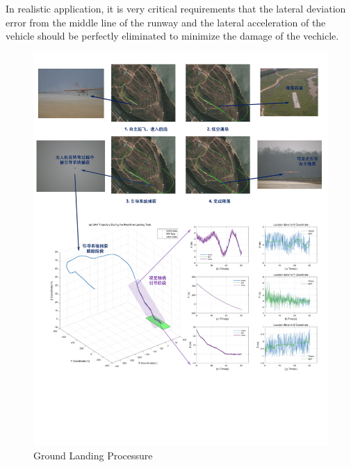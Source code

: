 In realistic application, it is very critical requirements that the lateral deviation error from the middle line of the runway and the lateral acceleration of the vehicle should be perfectly eliminated to minimize the damage of the vechicle.
\begin{figure}[!th]
	\centering
	\includegraphics[width=\textwidth]{Figs/chp08_23_ground_landing.pdf}	
	\caption{Ground Landing Processure}
	\label{fig:chp08_23_ground_landing}
\end{figure}




